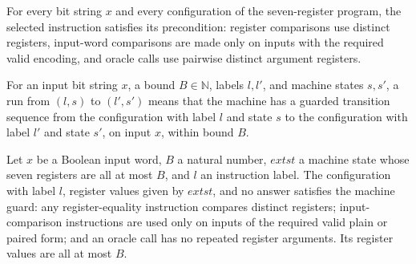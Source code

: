 \begin{lemma}
\label{Complexity.LogProg.TQBFARM.preS_A}
\leanok
{}
For every bit string $x$ and every configuration of the seven-register program, the
selected instruction satisfies its precondition: register comparisons use distinct
registers, input-word comparisons are made only on inputs with the required valid
encoding, and oracle calls use pairwise distinct argument registers.
\end{lemma}

\begin{definition}
\label{Complexity.LogProg.TQBFARM.Run}
\leanok
{}
For an input bit string $x$, a bound $B\in\mathbb N$, labels $l,l'$, and machine states
$s,s'$, a run from $(l,s)$ to $(l',s')$ means that the machine has a guarded transition
sequence from the configuration with label $l$ and state $s$ to the configuration with
label $l'$ and state $s'$, on input $x$, within bound $B$.
\end{definition}

\begin{lemma}
\label{Complexity.LogProg.TQBFARM.gb_of}
\leanok
{}
Let $x$ be a Boolean input word, $B$ a natural number, $	ext{st}$ a machine state whose
seven registers are all at most $B$, and $l$ an instruction label. The configuration
with label $l$, register values given by $	ext{st}$, and no answer satisfies the machine
guard: any register-equality instruction compares distinct registers; input-comparison
instructions are used only on inputs of the required valid plain or paired form; and an
oracle call has no repeated register arguments. Its register values are all at most $B$.
\end{lemma}

